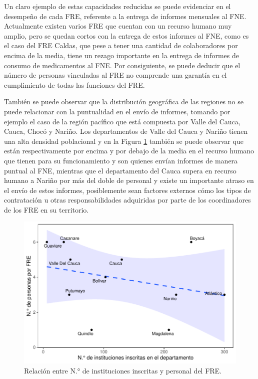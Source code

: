 \documentclass[
]{book}
\begin{document}
Un claro ejemplo de estas capacidades reducidas se puede evidenciar en el desempeño de cada FRE, referente a la entrega de informes mensuales al FNE. Actualmente existen varios FRE que cuentan con un recurso humano muy amplio, pero se quedan cortos con la entrega de estos informes al FNE, como es el caso del FRE Caldas, que pese a tener una cantidad de colaboradores por encima de la media, tiene un rezago importante en la entrega de informes de consumo de medicamentos al FNE. Por consiguiente, se puede deducir que el número de personas vinculadas al FRE no comprende una garantía en el cumplimiento de todas las funciones del FRE.

También se puede observar que la distribución geográfica de las regiones no se puede relacionar con la puntualidad en el envío de informes, tomando por ejemplo el caso de la región pacífico que está compuesta por Valle del Cauca, Cauca, Chocó y Nariño. Los departamentos de Valle del Cauca y Nariño tienen una alta densidad poblacional y en la Figura \ref{fig:institucionesInscritasRelacion} también se puede observar que están respectivamente por encima y por debajo de la media en el recurso humano que tienen para su funcionamiento y son quienes envían informes de manera puntual al FNE, mientras que el departamento del Cauca supera en recurso humano a Nariño por más del doble de personal y existe un importante atraso en el envío de estos informes, posiblemente sean factores externos cómo los tipos de contratación u otras responsabilidades adquiridas por parte de los coordinadores de los FRE en su territorio.

\begin{figure}[t]

{\centering \includegraphics[width=0.85\linewidth]{InformeFinal_files/figure-latex/institucionesInscritasRelacion-1} 

}

\caption{Relación entre N.° de instituciones inscritas y personal del FRE.}\label{fig:institucionesInscritasRelacion}
\end{figure}
\end{document}
